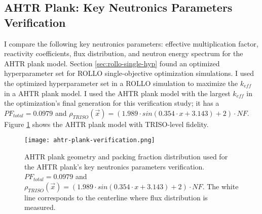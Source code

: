 \subsection{AHTR Plank: Key Neutronics Parameters Verification}
\label{sec:plank-knp}
I compare the following key neutronics parameters: effective 
multiplication factor, reactivity coefficients, flux distribution, and neutron energy 
spectrum for the \gls{AHTR} plank model.  
Section \ref{sec:rollo-single-hyp} found an optimized hyperparameter set for \gls{ROLLO} 
single-objective optimization simulations.
I used the optimized hyperparameter set in a \gls{ROLLO} simulation to maximize the 
$k_{eff}$ in a \gls{AHTR} plank model. 
I used the \gls{AHTR} plank model with the largest $k_{eff}$ in the optimization's 
final generation for this verification study; it has a $PF_{total} = 0.0979$ and 
$\rho_{TRISO}(\vec{x}) = \left(1.989\cdot sin(0.354\cdot x + 3.143) + 2\right) \cdot NF$.
Figure \ref{fig:ahtr-plank-verification} shows the \gls{AHTR} plank model with 
TRISO-level fidelity.
 \begin{figure}[htbp]
    \centering
    \texttt{[image: ahtr-plank-verification.png]}
    \raggedright
    \caption{\acrfull{AHTR} plank geometry and packing fraction distribution used for 
    the \gls{AHTR} plank's key neutronics parameters verification. 
    $PF_{total} = 0.0979$ and 
    $\rho_{TRISO}(\vec{x}) = \left(1.989\cdot sin(0.354\cdot x + 3.143) + 2\right) \cdot NF$. 
    The white line corresponds to the centerline where flux distribution is measured. }  
    \label{fig:ahtr-plank-verification}
\end{figure}

